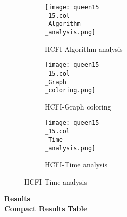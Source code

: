 \documentclass[10pt]{article}
\begin{document}
\graphicspath{{./Core1/Solutions/HCFI/queen15\_15.col}}
\begin{figure}[H]
\begin{subfigure}{.33\textwidth}
  \centering
  \texttt{[image: queen15\\\_15.col\\\_Algorithm\\\_analysis.png]}
  \caption{HCFI-Algorithm analysis}
   \label{fig:subfig1}
\end{subfigure}%
\begin{subfigure}{.33\textwidth}
  \centering
  \texttt{[image: queen15\\\_15.col\\\_Graph\\\_coloring.png]}
  \caption{HCFI-Graph coloring}
  \label{fig:subfig2}
\end{subfigure}
\begin{subfigure}{.33\textwidth}
  \centering
  \texttt{[image: queen15\\\_15.col\\\_Time\\\_analysis.png]}
  \caption{HCFI-Time analysis}
  \end{subfigure}
\end{figure}
\vspace{2cm}
\begin{center}
\hyperlink{page.8}{\textbf{Results}}\\
\vspace{0.5cm}
\hyperlink{page.71}{\textbf{Compact Results Table}}
\end{center}
\pagebreak
\end{document}
